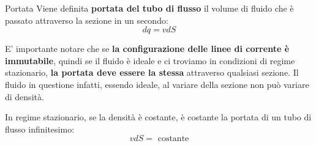 \documentclass[x11names]{report}
\begin{document}
	\begin{center}
		\colorbox{yblue}{\begin{minipage}{5.75in}
				\begin{blues}{Portata}
					Viene definita \textbf{portata del tubo di flusso} il volume di fluido che è passato attraverso la sezione in un secondo:
					\begin{equation}
						dq = v dS
					\end{equation}
				\end{blues}
		\end{minipage}}
	\end{center}
	E' importante notare che se \textbf{la configurazione delle linee di corrente è immutabile}, quindi se il fluido è ideale e ci troviamo in condizioni di regime stazionario, \textbf{la portata deve essere la stessa} attraverso qualsiasi sezione. Il fluido in questione infatti, essendo ideale, al variare della sezione non può variare di densità.
	
	
	
	
	\begin{center}
		\colorbox{yred}{\begin{minipage}{5.75in}
				\begin{redes}{}
					In regime stazionario, se la densità è costante, è costante la portata di un tubo di flusso infinitesimo:
					\[ 
					vdS = \text{ costante}
					\]
				\end{redes}
		\end{minipage}}
	\end{center}
	
	
\end{document}
